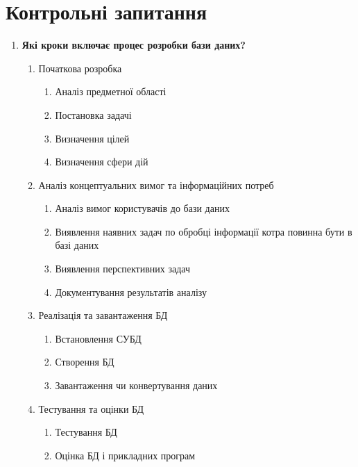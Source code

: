 \section{Контрольні запитання}

\begin{enumerate}

    \item \textbf{Які кроки включає процес розробки бази даних?}

          \begin{enumerate}
              \item Початкова розробка
                    \begin {enumerate}
              \item Аналіз предметної області
              \item Постановка задачі
              \item Визначення цілей
              \item Визначення сфери дій
          \end{enumerate}

    \item Аналіз концептуальних вимог та інформаційних потреб

          \begin{enumerate}
              \item Аналіз вимог користувачів до бази даних
              \item Виявлення наявних задач по обробці інформації котра повинна бути в базі даних
              \item Виявлення перспективних задач
              \item Документування результатів аналізу
          \end{enumerate}

    \item Реалізація та завантаження БД

          \begin{enumerate}
              \item Встановлення СУБД
              \item Створення БД
              \item Завантаження чи конвертування даних
          \end{enumerate}

    \item Тестування та оцінки БД

          \begin{enumerate}
              \item Тестування БД
              \item Оцінка БД і прикладних програм
          \end{enumerate}
\end{enumerate}


\end{enumerate}
